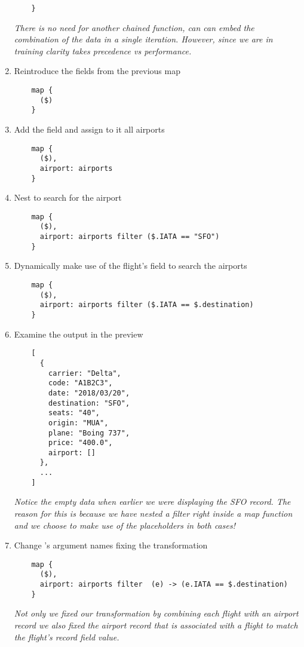 \begin{enumerate}[resume*]
\begin{verbatim}
    }
  \end{verbatim}
  \emph{
    There is no need for another chained  function, can can embed the combination of the data in a single iteration.  However, since we are in training clarity takes precedence vs performance.
  }
\item Reintroduce the fields from the previous map
  \begin{verbatim}
    map {
      ($)
    }
  \end{verbatim}
\item Add the  field and assign to it all airports
  \begin{verbatim}
    map {
      ($),
      airport: airports
    }
  \end{verbatim}
\item Nest  to search for the  airport
  \begin{verbatim}
    map {
      ($),
      airport: airports filter ($.IATA == "SFO")
    }
  \end{verbatim}
\item Dynamically make use of the flight's  field to search the airports
  \begin{verbatim}
    map {
      ($),
      airport: airports filter ($.IATA == $.destination)
    }
  \end{verbatim}
\item Examine the output in the preview
  \begin{verbatim}
    [
      {
        carrier: "Delta",
        code: "A1B2C3",
        date: "2018/03/20",
        destination: "SFO",
        seats: "40",
        origin: "MUA",
        plane: "Boing 737",
        price: "400.0",
        airport: []
      },
      ...
    ]
  \end{verbatim}
  \emph{
    Notice the empty data when earlier we were displaying the SFO record.  The reason for this is because we have nested a filter right inside a map function and we choose to make use of the \ttt{\$} placeholders in both cases!
  }
\item Change 's \les{} argument names fixing the transformation
  \begin{verbatim}
    map {
      ($),
      airport: airports filter  (e) -> (e.IATA == $.destination)
    }
  \end{verbatim}
  \emph{
    Not only we fixed our transformation by combining each flight with an airport record we also fixed the airport record that is associated with a flight to match the flight's record  field value.
  } 
\end{enumerate}

